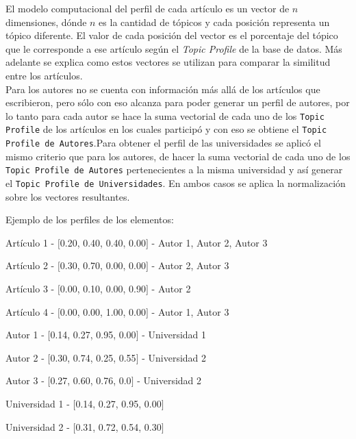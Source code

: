 El modelo computacional del perfil de cada artículo es un vector de $n$ dimensiones, dónde $n$ es la cantidad de tópicos y cada posición representa un tópico diferente. El valor de cada posición del vector es el porcentaje del tópico que le corresponde a ese artículo según el \textit{Topic Profile} de la base de datos. Más adelante se explica como estos vectores se utilizan para comparar la similitud entre los artículos.\\

Para los autores no se cuenta con información más allá de los artículos que escribieron, pero sólo con eso alcanza para poder generar un perfil de autores, por lo tanto para cada autor se hace la suma vectorial de cada uno de los \texttt{Topic Profile} de los artículos en los cuales participó y con eso se obtiene el \texttt{Topic Profile de Autores}.Para obtener el perfil de las universidades se aplicó el mismo criterio que para los autores, de hacer la suma vectorial de cada uno de los \texttt{Topic Profile de Autores} pertenecientes a la misma universidad y así generar el \texttt{Topic Profile de Universidades}. En ambos casos se aplica la normalización sobre los vectores resultantes.

Ejemplo de los perfiles de los elementos:

\begin{description}
 \item[Artículo - Topic Profile - Autores]
 \item Artículo 1 - $[$0.20, 0.40, 0.40, 0.00$]$ - Autor 1, Autor 2, Autor 3
 \item Artículo 2 - $[$0.30, 0.70, 0.00, 0.00$]$ - Autor 2, Autor 3
 \item Artículo 3 - $[$0.00, 0.10, 0.00, 0.90$]$ - Autor 2
 \item Artículo 4 - $[$0.00, 0.00, 1.00, 0.00$]$ - Autor 1, Autor 3
\end{description}

\begin{description}
 \item[Autor - Topic Profile - Universidad]
 \item Autor 1 - $[$0.14, 0.27, 0.95, 0.00$]$ - Universidad 1
 \item Autor 2 - $[$0.30, 0.74, 0.25, 0.55$]$ - Universidad 2
 \item Autor 3 - $[$0.27, 0.60, 0.76, 0.0$]$ - Universidad 2
\end{description}

\begin{description}
 \item[Universidad - Topic Profile]
 \item Universidad 1 - $[$0.14, 0.27, 0.95, 0.00$]$
 \item Universidad 2 - $[$0.31, 0.72, 0.54, 0.30$]$
\end{description}

